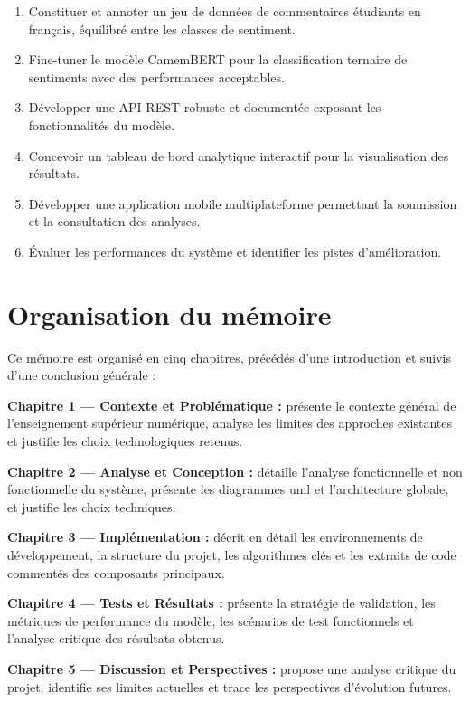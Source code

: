 \begin{enumerate}[leftmargin=2.5em]
  \item Constituer et annoter un jeu de données de commentaires étudiants
        en français, équilibré entre les classes de sentiment.
  \item Fine-tuner le modèle CamemBERT pour la classification ternaire de
        sentiments avec des performances acceptables.
  \item Développer une API REST robuste et documentée exposant les
        fonctionnalités du modèle.
  \item Concevoir un tableau de bord analytique interactif pour la
        visualisation des résultats.
  \item Développer une application mobile multiplateforme permettant la
        soumission et la consultation des analyses.
  \item Évaluer les performances du système et identifier les pistes
        d'amélioration.
\end{enumerate}

\section*{Organisation du mémoire}

Ce mémoire est organisé en cinq chapitres, précédés d'une introduction et
suivis d'une conclusion générale :

\vspace{0.3em}
\noindent\textbf{Chapitre 1 — Contexte et Problématique :} présente le
contexte général de l'enseignement supérieur numérique, analyse les limites
des approches existantes et justifie les choix technologiques retenus.

\vspace{0.3em}
\noindent\textbf{Chapitre 2 — Analyse et Conception :} détaille l'analyse
fonctionnelle et non fonctionnelle du système, présente les diagrammes
\acrshort{uml} et l'architecture globale, et justifie les choix techniques.

\vspace{0.3em}
\noindent\textbf{Chapitre 3 — Implémentation :} décrit en détail les
environnements de développement, la structure du projet, les algorithmes
clés et les extraits de code commentés des composants principaux.

\vspace{0.3em}
\noindent\textbf{Chapitre 4 — Tests et Résultats :} présente la stratégie
de validation, les métriques de performance du modèle, les scénarios de
test fonctionnels et l'analyse critique des résultats obtenus.

\vspace{0.3em}
\noindent\textbf{Chapitre 5 — Discussion et Perspectives :} propose une
analyse critique du projet, identifie ses limites actuelles et trace les
perspectives d'évolution futures.

\cleardoublepage
